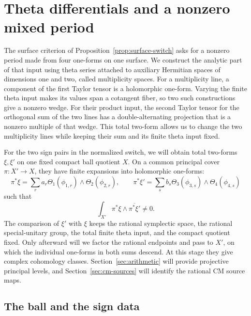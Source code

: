 \section{Theta differentials and a nonzero mixed period}\label{sec:theta}

The surface criterion of Proposition~\ref{prop:surface-switch} asks for
a nonzero period made from four one-forms on one surface.  We construct
the analytic part of that input using theta series attached to auxiliary
Hermitian spaces of dimensions one and two, called multiplicity spaces.
For a multiplicity line, a component of the first Taylor tensor is a
holomorphic one-form.  Varying the finite theta input makes its values
span a cotangent fiber, so two such constructions give a nonzero wedge.
For their product input, the second Taylor tensor for the orthogonal
sum of the two lines has a double-alternating projection that is a
nonzero multiple of that wedge.  This total two-form allows us to change
the two multiplicity lines while keeping their sum and its finite theta
input fixed.

For the two sign pairs in the normalized switch, we will obtain total
two-forms \(\xi,\xi'\) on one fixed compact ball quotient \(X\).
On a common principal cover \(\pi:X'\to X\), they have finite
expansions into holomorphic one-forms:
\[
 \pi^*\xi=\sum_r a_r\Theta_1(\phi_{1,r})\wedge\Theta_2(\phi_{2,r}),
 \qquad
 \pi^*\xi'=\sum_s b_s\Theta_3(\phi_{3,s})\wedge\Theta_4(\phi_{4,s})
\]
such that
\begin{equation}\label{eq:theta-mixed-period-goal}
 \int_{X'} \pi^*\xi\wedge\overline{\pi^*\xi'}\ne0.
\end{equation}
The comparison of \(\xi'\) with \(\xi\) keeps the rational
symplectic space, the rational special-unitary group, the total finite
theta input, and the compact quotient fixed.  Only afterward will we
factor the rational endpoints and pass to \(X'\), on which the
individual one-forms in both sums descend.  At this stage they give
complex cohomology classes.  Section~\ref{sec:arithmetic} will provide
projective principal levels, and Section~\ref{sec:cm-sources} will
identify the rational CM source maps.

\subsection{The ball and the sign data}\label{subsec:theta-ball}

